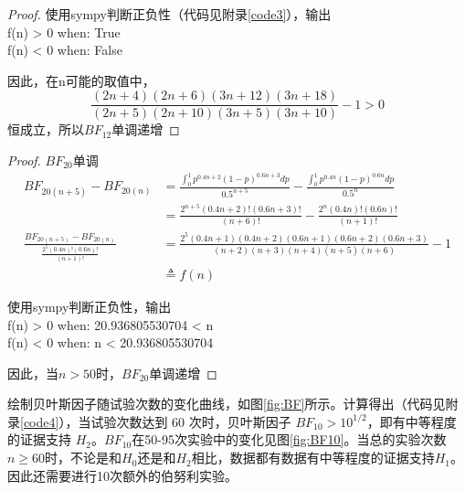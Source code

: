 \documentclass[stu,12pt,floatsintext]{apa7} %
\begin{document}
\begin{enumerate}[itemsep=2pt,topsep=0pt,parsep=0pt,label=(\alph*)]
\begin{proof}
    使用sympy判断正负性（代码见附录\ref{code3}），输出\\
    f(n) > 0 when: True\\
    f(n) < 0 when: False

    因此，在n可能的取值中，
    \[\frac{(2n+4)(2n+6)(3n+12)(3n+18)}{(2n+5)(2n+10)(3n+5)(3n+10)}-1>0\]恒成立，所以\(BF_{12}\)单调递增
    \end{proof}

    \begin{proof}
    \(BF_{20}\)单调
    \begin{align*}
        BF_{20(n+5)}-BF_{20(n)} & = \frac{\int_0^1 p^{0.4n+2} (1-p)^{0.6n+3} dp}{0.5^{n+5}} - \frac{\int_0^1 p^{0.4n} (1-p)^{0.6n} dp}{0.5^{n}}\\
        & = \frac{{2}^{n + 5} \left(0.4 n + 2\right)! \left(0.6 n + 3\right)!}{\left( n + 6\right)!} - \frac{ {2}^{n} \left(0.4 n\right)! \left(0.6 n\right)!}{\left( n + 1\right)!}\\
        \frac{BF_{20(n+5)}-BF_{20(n)}}{\frac{2^5(0.4n)!(0.6n)!}{(n+1)!}} & =\frac{2^5(0.4n+1)(0.4n+2)(0.6n+1)(0.6n+2)(0.6n+3)}{(n+2)(n+3)(n+4)(n+5)(n+6)}-1\\
        & \triangleq f(n)
    \end{align*}

    使用sympy判断正负性，输出\\
    f(n) > 0 when: 20.936805530704 < n\\
    f(n) < 0 when: n < 20.936805530704

    因此，当\(n>50\)时，\(BF_{20}\)单调递增
    \end{proof}

    
    绘制贝叶斯因子随试验次数的变化曲线，如图\ref{fig:BF}所示。计算得出（代码见附录\ref{code4}），当试验次数达到 60 次时，贝叶斯因子 \(BF_{10}> 10^{1/2}\)，即有中等程度的证据支持 \(H_2\)。\(BF_{10}\)在50-95次实验中的变化见图\ref{fig:BF10}。当总的实验次数\(n \geq 60\)时，不论是和\(H_0\)还是和\(H_2\)相比，数据都有数据有中等程度的证据支持\(H_1\)。\\
    
    \vspace{0.5\baselineskip}
    因此还需要进行10次额外的伯努利实验。


\end{enumerate}
\end{document}
